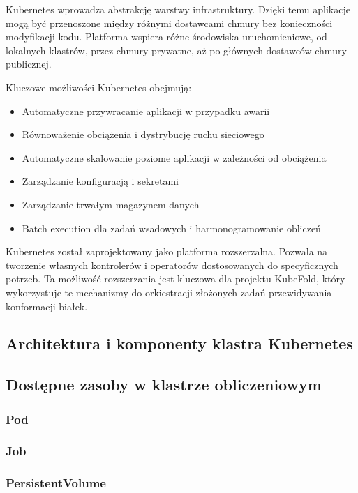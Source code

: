 Kubernetes wprowadza abstrakcję warstwy infrastruktury.
Dzięki temu aplikacje mogą być przenoszone między różnymi dostawcami chmury bez konieczności modyfikacji kodu.
Platforma wspiera różne środowiska uruchomieniowe, od lokalnych klastrów, przez chmury prywatne, aż po głównych dostawców chmury publicznej.

Kluczowe możliwości Kubernetes obejmują:
\begin{itemize}
    \item Automatyczne przywracanie aplikacji w przypadku awarii
    \item Równoważenie obciążenia i dystrybucję ruchu sieciowego
    \item Automatyczne skalowanie poziome aplikacji w zależności od obciążenia
    \item Zarządzanie konfiguracją i sekretami
    \item Zarządzanie trwałym magazynem danych
    \item Batch execution dla zadań wsadowych i harmonogramowanie obliczeń
\end{itemize}

Kubernetes został zaprojektowany jako platforma rozszerzalna.
Pozwala na tworzenie własnych kontrolerów i operatorów dostosowanych do specyficznych potrzeb.
Ta możliwość rozszerzania jest kluczowa dla projektu KubeFold, który wykorzystuje te mechanizmy do orkiestracji złożonych zadań przewidywania konformacji białek.

\subsection{Architektura i komponenty klastra Kubernetes}

\subsection{Dostępne zasoby w klastrze obliczeniowym}

\subsubsection{Pod}

\subsubsection{Job}

\subsubsection{PersistentVolume}

